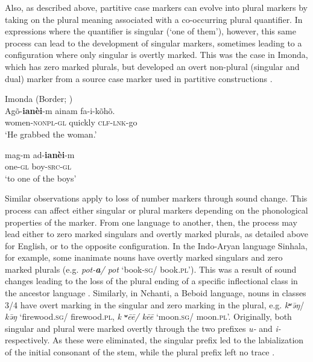 \documentclass[output=paper]{langsci/langscibook}
\begin{document}
Also, as described above, partitive case markers can evolve into plural markers by
taking on the plural meaning associated with a co-occurring plural
quantifier. In expressions where the quantifier is singular (`one of
them'), however, this same process can lead to the development of
singular markers, sometimes leading to a configuration where only singular
is overtly marked. This was the case in Imonda, which has zero marked plurals, but developed
an overt non-plural
(singular and dual) marker
 from a source case marker used in partitive constructions .

\ea\label{imonda2}
Imonda (Border; )\\
\ea
\gll Agõ-\textbf{{ianèi}}-m ainam fa-i-kõhõ.\\
women-\textsc{nonpl-gl} quickly \textsc{clf-lnk}-go\\
\glt `He grabbed the woman.' 

\ex
\gll mag-m ad-\textbf{{ianèi}}-m \\
one-\textsc{gl} boy-\textsc{src-gl} \\
\glt `to one of the boys'


\z
\z


Similar observations apply to loss of number markers through sound
change. This process can affect
either singular or plural markers depending on the phonological
properties of the marker. From one language to another, then, the process may lead either to  zero marked singulars and
overtly marked plurals, as detailed above for
English, or to the opposite configuration. In the
Indo-Aryan language Sinhala,  for example, some inanimate nouns have
overtly marked singulars and
zero marked plurals
 (e.g. {\em pot-\textbf{\textit {a}}/ pot} `book-\textsc{sg}/ book.\textsc{pl}'). This was a result of
 sound changes leading to the loss of the plural ending of a specific inflectional class in the ancestor language
 \citealt[250--256]{NitzNordhoff2010}. Similarly, in Nchanti, a Beboid
 language, nouns in classes 3/4 have overt
  marking in the singular and zero marking in the plural, e.g. {\em
    k{\bf ʷ}\=əŋ}/ {\em
    k\=əŋ} `firewood.\textsc{sg}/ firewood.\textsc{pl}, {\em k{\bf
      ʷ}ēē/ kēē} `moon.\textsc{sg}/ moon.\textsc{pl}'.
  Originally, both singular and plural were marked overtly through the
  two prefixes {\em *u-} and {\em *i-} respectively. As these were
  eliminated, the singular prefix led to the labialization of the
  initial consonant of the stem, while the plural prefix left no trace
  \cite{Hombert1980}.
\end{document}

